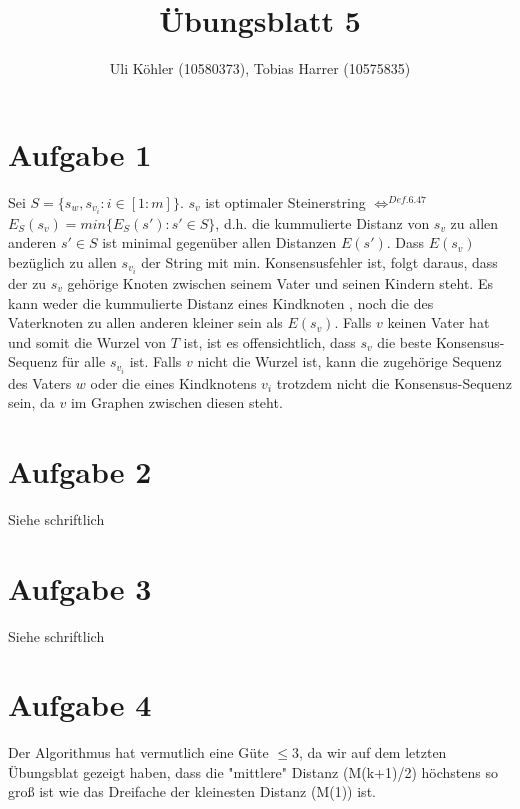 \documentclass[a4paper,10pt,oneside,reqno]{scrartcl}
\title{Übungsblatt 5}
\author{Uli Köhler (10580373), Tobias Harrer (10575835)}
\begin{document}
\maketitle

\section*{Aufgabe 1}
Sei $S=\{s_w, s_{v_i} : i \in [1:m]\}$. $s_v$ ist optimaler Steinerstring $\Leftrightarrow^{Def. 6.47}$ $E_S(s_v)=min\{E_S(s') : s' \in S\}$,
d.h. die kummulierte Distanz von $s_v$ zu allen anderen $s' \in S$ ist minimal gegenüber allen Distanzen $E(s')$. Dass $E(s_v)$
bezüglich zu allen $s_{v_i}$ der String mit min. Konsensusfehler ist, folgt daraus, dass der zu $s_v$ gehörige Knoten zwischen
seinem Vater und seinen Kindern steht. Es kann weder die kummulierte Distanz eines Kindknoten , noch die des Vaterknoten zu allen
anderen kleiner sein als $E(s_v)$. Falls $v$ keinen Vater hat und somit die Wurzel von $T$ ist, ist es offensichtlich, dass $s_v$
die beste Konsensus-Sequenz für alle $s_{v_i}$ ist. Falls $v$ nicht die Wurzel ist, kann die zugehörige Sequenz des Vaters $w$
oder die eines Kindknotens $v_i$ trotzdem nicht die Konsensus-Sequenz sein, da $v$ im Graphen zwischen diesen steht.

\section*{Aufgabe 2}
Siehe schriftlich

\section*{Aufgabe 3}
Siehe schriftlich

\section*{Aufgabe 4}
Der Algorithmus hat vermutlich eine Güte $\leq 3$, da wir auf dem letzten Übungsblat gezeigt haben, dass die "mittlere"
Distanz (M(k+1)/2) höchstens so groß ist wie das Dreifache der kleinesten Distanz (M(1)) ist.
\end{document}
